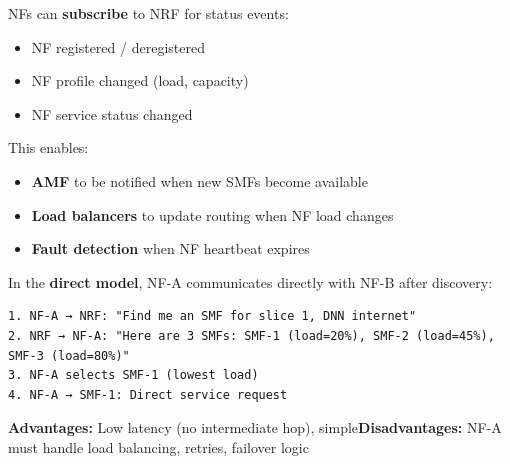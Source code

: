
NFs can \textbf{subscribe} to NRF for status events:

\begin{itemize}
\tightlist
\item
  NF registered /\allowbreak{} deregistered
\item
  NF profile changed (load, capacity)
\item
  NF service status changed
\end{itemize}

This enables:

\begin{itemize}
\tightlist
\item
  \textbf{AMF} to be notified when new SMFs become available
\item
  \textbf{Load balancers} to update routing when NF load changes
\item
  \textbf{Fault detection} when NF heartbeat expires
\end{itemize}






\CNchained{}

In the \textbf{direct model}, NF-A communicates directly with NF-B after discovery:

\def\CNcodelang{}

\begin{CNplaincode}
\begin{Verbatim}
1. NF-A → NRF: "Find me an SMF for slice 1, DNN internet"
2. NRF → NF-A: "Here are 3 SMFs: SMF-1 (load=20%), SMF-2 (load=45%), SMF-3 (load=80%)"
3. NF-A selects SMF-1 (lowest load)
4. NF-A → SMF-1: Direct service request
\end{Verbatim}
\end{CNplaincode}

\textbf{Advantages:} Low latency (no intermediate hop), simple\CNbr{}\textbf{Disadvantages:} NF-A must handle load balancing, retries, failover logic



